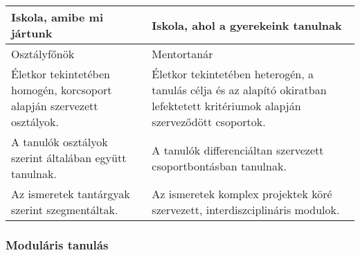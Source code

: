 \begin{longtable}[]{@{}ll@{}}
\toprule
\begin{minipage}[b]{0.33\columnwidth}\raggedright
Iskola, amibe mi jártunk\strut
\end{minipage} & \begin{minipage}[b]{0.61\columnwidth}\raggedright
Iskola, ahol a gyerekeink tanulnak\strut
\end{minipage}\tabularnewline
\midrule
\endhead
\begin{minipage}[t]{0.33\columnwidth}\raggedright
Osztályfőnök\strut
\end{minipage} & \begin{minipage}[t]{0.61\columnwidth}\raggedright
Mentortanár\strut
\end{minipage}\tabularnewline
\begin{minipage}[t]{0.33\columnwidth}\raggedright
Életkor tekintetében homogén, korcsoport alapján szervezett
osztályok.\strut
\end{minipage} & \begin{minipage}[t]{0.61\columnwidth}\raggedright
Életkor tekintetében heterogén, a tanulás célja és az alapító okiratban
lefektetett kritériumok alapján szerveződött csoportok.\strut
\end{minipage}\tabularnewline
\begin{minipage}[t]{0.33\columnwidth}\raggedright
A tanulók osztályok szerint általában együtt tanulnak.\strut
\end{minipage} & \begin{minipage}[t]{0.61\columnwidth}\raggedright
A tanulók differenciáltan szervezett csoportbontásban tanulnak.\strut
\end{minipage}\tabularnewline
\begin{minipage}[t]{0.33\columnwidth}\raggedright
Az ismeretek tantárgyak szerint szegmentáltak.\strut
\end{minipage} & \begin{minipage}[t]{0.61\columnwidth}\raggedright
Az ismeretek komplex projektek köré szervezett, interdiszciplináris
modulok.\strut
\end{minipage}\tabularnewline
\bottomrule
\end{longtable}

\hypertarget{modularis-tanulas}{%
\subsubsection{Moduláris tanulás}\label{modularis-tanulas}}

